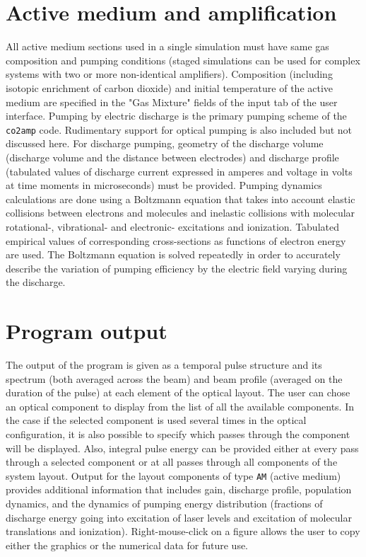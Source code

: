 \documentclass{report}
\begin{document}
\section{Active medium and amplification}
All active medium sections used in a single simulation must have same gas composition and pumping conditions (staged simulations can be used for complex systems with two or more non-identical amplifiers).  Composition (including isotopic enrichment of carbon dioxide) and initial temperature of the active medium are specified in the "Gas Mixture" fields of the input tab of the user interface.
Pumping by electric discharge is the primary pumping scheme of the \texttt{co2amp} code. Rudimentary support for optical pumping is also included but not discussed here. For discharge pumping, geometry of the discharge volume (discharge volume and the distance between electrodes) and discharge profile (tabulated values of discharge current expressed in amperes and voltage in volts at time moments in microseconds) must be provided. Pumping dynamics calculations are done using a Boltzmann equation that takes into account elastic collisions between electrons and molecules and inelastic collisions with molecular rotational-, vibrational- and electronic- excitations and ionization. Tabulated empirical values of corresponding cross-sections as functions of electron energy are used. The Boltzmann equation is solved repeatedly in order to accurately describe the variation of pumping efficiency by the electric field varying during the discharge. 


\section{Program output}
The output of the program is given as a temporal pulse structure and its spectrum (both averaged across the beam) and beam profile (averaged on the duration of the pulse) at each element of the optical layout. The user can chose an optical component to display from the list of all the available components. In the case if the selected component is used several times in the optical configuration, it is also possible to specify which passes through the component will be displayed. Also, integral pulse energy can be provided either at every pass through a selected component or at all passes through all components of the system layout.
Output for the layout components of type \texttt{AM} (active medium) provides additional information that includes gain, discharge profile, population dynamics, and the dynamics of pumping energy distribution (fractions of discharge energy going into excitation of laser levels and excitation of molecular translations and ionization).
Right-mouse-click on a figure allows the user to copy either the graphics or the numerical data for future use.
\end{document}
